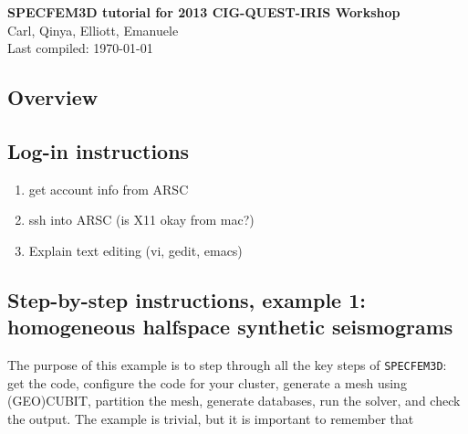 \documentclass[10pt,titlepage,fleqn,letterpaper]{article}
\begin{document}

\noindent
{\bf SPECFEM3D tutorial for 2013 CIG-QUEST-IRIS Workshop} \\
\noindent Carl, Qinya, Elliott, Emanuele  \\
\noindent Last compiled: \today \\



\subsection*{Overview}


\subsection*{Log-in instructions}

\begin{enumerate}
\item get account info from ARSC
\item ssh into ARSC (is X11 okay from mac?)
\item Explain text editing (vi, gedit, emacs)
\end{enumerate}


\subsection*{Step-by-step instructions, example 1: homogeneous halfspace synthetic seismograms}

The purpose of this example is to step through all the key steps of \verb+SPECFEM3D+: get the code, configure the code for your cluster, generate a mesh using (GEO)CUBIT, partition the mesh, generate databases, run the solver, and check the output. The example is trivial, but it is important to remember that 
\end{document}
